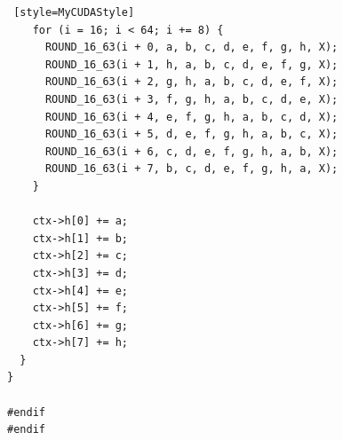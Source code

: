 \documentclass{article}
\begin{document}
\begin{lstlisting} [style=MyCUDAStyle]
    for (i = 16; i < 64; i += 8) {
      ROUND_16_63(i + 0, a, b, c, d, e, f, g, h, X);
      ROUND_16_63(i + 1, h, a, b, c, d, e, f, g, X);
      ROUND_16_63(i + 2, g, h, a, b, c, d, e, f, X);
      ROUND_16_63(i + 3, f, g, h, a, b, c, d, e, X);
      ROUND_16_63(i + 4, e, f, g, h, a, b, c, d, X);
      ROUND_16_63(i + 5, d, e, f, g, h, a, b, c, X);
      ROUND_16_63(i + 6, c, d, e, f, g, h, a, b, X);
      ROUND_16_63(i + 7, b, c, d, e, f, g, h, a, X);
    }

    ctx->h[0] += a;
    ctx->h[1] += b;
    ctx->h[2] += c;
    ctx->h[3] += d;
    ctx->h[4] += e;
    ctx->h[5] += f;
    ctx->h[6] += g;
    ctx->h[7] += h;
  }
}

#endif
#endif

\end{lstlisting}
\end{document}
